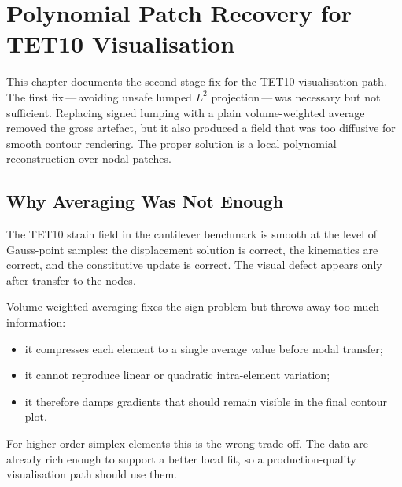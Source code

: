 
\chapter{Polynomial Patch Recovery for TET10 Visualisation}
\label{ch:patch_recovery}

This chapter documents the second-stage fix for the TET10 visualisation path.
The first fix\,---\,avoiding unsafe lumped $L^2$ projection\,---\,was
necessary but not sufficient.  Replacing signed lumping with a plain
volume-weighted average removed the gross artefact, but it also produced a
field that was too diffusive for smooth contour rendering.  The proper
solution is a local polynomial reconstruction over nodal patches.


\section{Why Averaging Was Not Enough}
\label{sec:patch_not_enough}

The TET10 strain field in the cantilever benchmark is smooth at the level of
Gauss-point samples: the displacement solution is correct, the kinematics are
correct, and the constitutive update is correct.  The visual defect appears
only after transfer to the nodes.

Volume-weighted averaging fixes the sign problem but throws away too much
information:
\begin{itemize}[nosep]
  \item it compresses each element to a single average value before nodal
        transfer;
  \item it cannot reproduce linear or quadratic intra-element variation;
  \item it therefore damps gradients that should remain visible in the final
        contour plot.
\end{itemize}

For higher-order simplex elements this is the wrong trade-off.  The data are
already rich enough to support a better local fit, so a production-quality
visualisation path should use them.


